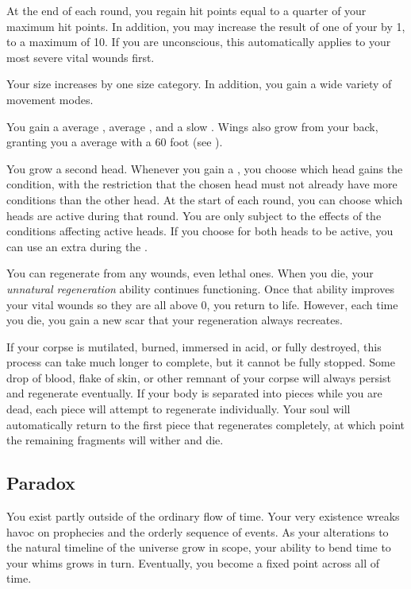        At the end of each round, you regain hit points equal to a quarter of your maximum hit points.
      In addition, you may increase the result of one of your  by 1, to a maximum of 10.
      If you are unconscious, this automatically applies to your most severe vital wounds first.

       Your size increases by one size category.
      In addition, you gain a wide variety of movement modes.

      You gain a average , average , and a slow .
      Wings also grow from your back, granting you a average  with a 60 foot  (see ).

       You grow a second head.
      Whenever you gain a , you choose which head gains the condition, with the restriction that the chosen head must not already have more conditions than the other head.
      At the start of each round, you can choose which heads are active during that round.
      You are only subject to the effects of the conditions affecting active heads.
      If you choose for both heads to be active, you can use an extra  during the .

       You can regenerate from any wounds, even lethal ones.
      When you die, your \textit{unnatural regeneration} ability continues functioning.
      Once that ability improves your vital wounds so they are all above 0, you return to life.
      However, each time you die, you gain a new scar that your regeneration always recreates.

      If your corpse is mutilated, burned, immersed in acid, or fully destroyed, this process can take much longer to complete, but it cannot be fully stopped.
      Some drop of blood, flake of skin, or other remnant of your corpse will always persist and regenerate eventually.
      If your body is separated into pieces while you are dead, each piece will attempt to regenerate individually.
      Your soul will automatically return to the first piece that regenerates completely, at which point the remaining fragments will wither and die.

  \subsection{Paradox}
    You exist partly outside of the ordinary flow of time.
    Your very existence wreaks havoc on prophecies and the orderly sequence of events.
    As your alterations to the natural timeline of the universe grow in scope, your ability to bend time to your whims grows in turn.
    Eventually, you become a fixed point across all of time.

